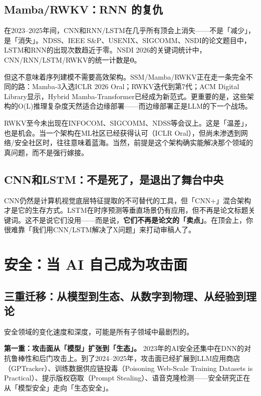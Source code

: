\documentclass[12pt,a4paper]{ctexart}
\begin{document}
\subsection{Mamba/RWKV：RNN 的复仇}

在2023--2025年间，CNN和RNN/LSTM在几乎所有顶会上消失——不是「减少」，是「消失」。NDSS、IEEE S\&P、USENIX、SIGCOMM、NSDI的论文题目中，LSTM和RNN的出现次数趋近于零。NSDI 2026的关键词统计中，CNN/RNN/LSTM/RWKV的统一计数是\textbf{0}。

但这不意味着序列建模不需要高效架构。SSM/Mamba/RWKV正在走一条完全不同的路：Mamba-3入选ICLR 2026 Oral；RWKV迭代到第7代；ACM Digital Library显示，Hybrid Mamba-Transformer已经成为新范式。更重要的是，这些架构的O(L)推理复杂度天然适合边缘部署——而边缘部署正是LLM的下一个战场。

\begin{thinkbox}
RWKV至今未出现在INFOCOM、SIGCOMM、NDSS等会议上。这是「温差」，也是机会。当一个架构在ML社区已经获得认可（ICLR Oral），但尚未渗透到网络/安全社区时，往往意味着蓝海。当然，前提是这个架构确实能解决那个领域的真问题，而不是强行嫁接。
\end{thinkbox}

\subsection{CNN和LSTM：不是死了，是退出了舞台中央}

CNN仍然是计算机视觉底层特征提取的不可替代的工具，但「CNN+」混合架构才是它的生存方式。LSTM在时序预测等垂直场景仍有应用，但不再是论文标题关键词。这不是说它们没用——而是说，\textbf{它们不再是论文的「卖点」}。在顶会上，你很难靠「我们用CNN/LSTM解决了X问题」来打动审稿人了。

\section{安全：当 AI 自己成为攻击面}

\subsection{三重迁移：从模型到生态、从数字到物理、从经验到理论}

安全领域的变化速度和深度，可能是所有子领域中最剧烈的。

\textbf{第一重：攻击面从「模型」扩张到「生态」。} 2023年的AI安全还集中在DNN的对抗鲁棒性和后门攻击上。到了2024--2025年，攻击面已经扩展到LLM应用商店（GPTracker）、训练数据供应链投毒（Poisoning Web-Scale Training Datasets is Practical）、提示版权窃取（Prompt Stealing）、语音克隆检测——安全研究正在从「模型安全」走向「生态安全」。
\end{document}

